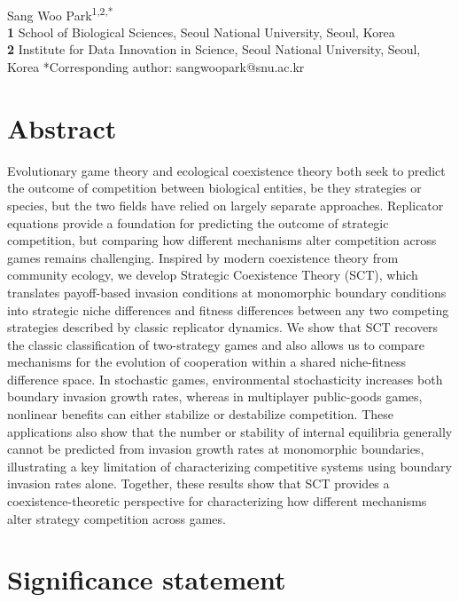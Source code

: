 \documentclass[12pt]{article}
\date{\today}
\begin{document}
\begin{flushleft}{
	\Large
	\textbf{}
}
\newline
\\
Sang Woo Park\textsuperscript{1,2,*}
\\
\bigskip
\textbf{1} School of Biological Sciences, Seoul National University, Seoul, Korea\\
\textbf{2} Institute for Data Innovation in Science, Seoul National University, Seoul, Korea
*Corresponding author: sangwoopark@snu.ac.kr
\end{flushleft}

\section*{Abstract}

Evolutionary game theory and ecological coexistence theory both seek to predict the outcome of competition between biological entities, be they strategies or species, but the two fields have relied on largely separate approaches. 
Replicator equations provide a foundation for predicting the outcome of strategic competition, but comparing how different mechanisms alter competition across games remains challenging. 
Inspired by modern coexistence theory from community ecology, we develop Strategic Coexistence Theory (SCT), which translates payoff-based invasion conditions at monomorphic boundary conditions into strategic niche differences and fitness differences between any two competing strategies described by classic replicator dynamics.
We show that SCT recovers the classic classification of two-strategy games and also allows us to compare mechanisms for the evolution of cooperation within a shared niche-fitness difference space.
In stochastic games, environmental stochasticity increases both boundary invasion growth rates, whereas in multiplayer public-goods games, nonlinear benefits can either stabilize or destabilize competition. 
These applications also show that the number or stability of internal equilibria generally cannot be predicted from invasion growth rates at monomorphic boundaries, illustrating a key limitation of characterizing competitive systems using boundary invasion rates alone.
Together, these results show that SCT provides a coexistence-theoretic perspective for characterizing how different mechanisms alter strategy competition across games.

\section*{Significance statement}
\end{document}
